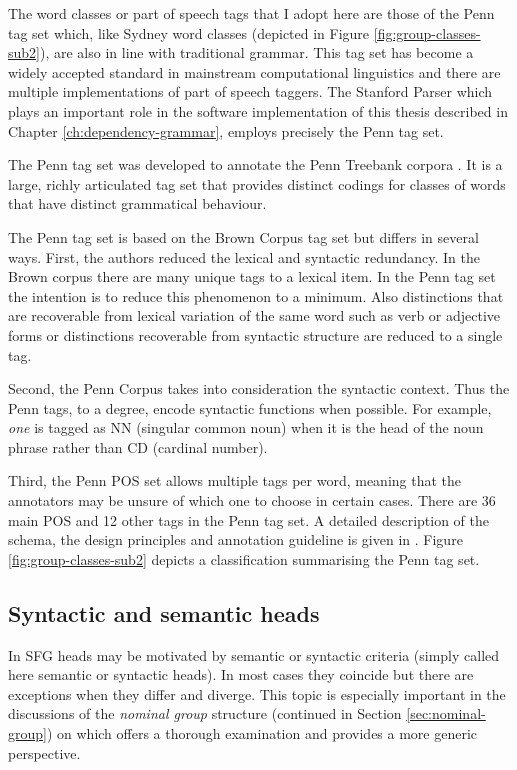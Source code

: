     The word classes or part of speech tags that I adopt here are those of the Penn tag set \citep{Marcus1993} which, like Sydney word classes (depicted in Figure \ref{fig:group-classes-sub2}), are also in line with traditional grammar. This tag set has become a widely accepted standard in mainstream computational linguistics and there are multiple implementations of part of speech taggers. The Stanford Parser which plays an important role in the software implementation of this thesis described in Chapter \ref{ch:dependency-grammar}, employs precisely the Penn tag set.

    The Penn tag set was developed to annotate the Penn Treebank corpora \citep{Marcus1993}. It is a large, richly articulated tag set that provides distinct codings for classes of words that have distinct grammatical behaviour.
    
    The Penn tag set is based on the Brown Corpus tag set \citep{Kucera1968} but differs in several ways. First, the authors reduced the lexical and syntactic redundancy. In the Brown corpus there are many unique tags to a lexical item. In the Penn tag set the intention is to reduce this phenomenon to a minimum. Also distinctions that are recoverable from lexical variation of the same word such as verb or adjective forms or distinctions recoverable from syntactic structure are reduced to a single tag. 
    
    Second, the Penn Corpus takes into consideration the syntactic context. Thus the Penn tags, to a degree, encode syntactic functions when possible. For example, \textit{one} is tagged as NN (singular common noun) when it is the head of the noun phrase rather than CD (cardinal number). 
    
    Third, the Penn POS set allows multiple tags per word, meaning that the annotators may be unsure of which one to choose in certain cases. There are 36 main POS and 12 other tags in the Penn tag set. A detailed description of the schema, the design principles and annotation guideline is given in \citet{Santorini1990}. Figure \ref{fig:group-classes-sub2} depicts a classification summarising the Penn tag set. 



\subsection{Syntactic and semantic heads}
\label{sec:heads}
    In SFG heads may be motivated by semantic or syntactic criteria (simply called here semantic or syntactic heads). In most cases they coincide but there are exceptions when they differ and diverge. This topic is especially important in the discussions of the \textit{nominal group} structure (continued in Section \ref{sec:nominal-group}) on which \citet{Halliday2013} offers a thorough examination and \citet{Fawcett2000} provides a more generic perspective.
    
